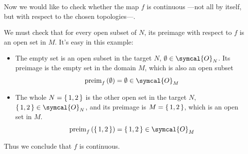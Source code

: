   Now we would like to check whether the map $f$ is continuous ---not all by
  itself, but with respect to the chosen topologies---.

  We must check that for every open subset of $N$, its preimage with respect to
  $f$ is an open set in $M$. It's easy in this example:
  \begin{itemize}
  \item The empty set is an open subset in the target
    $N$, $\emptyset\in\symcal{O}_N$. Its preimage is the empty set in the
    domain $M$, which is also an open subset
    \[
      \text{preim}_f\,(\emptyset) = \emptyset \in \symcal{O}_M 
    \]
    
  \item The whole $N=\set{1,2}$ is the other open set in the target $N$,
    $\set{1,2}\in\symcal{O}_N$,
    and its preimage is $M=\set{1,2}$, which is an open set in $M$.
    \[
      \text{preim}_f\,(\set{1,2}) = \set{1,2} \in \symcal{O}_M
    \]
  \end{itemize}
  Thus we conclude that $f$ is continuous.
  
